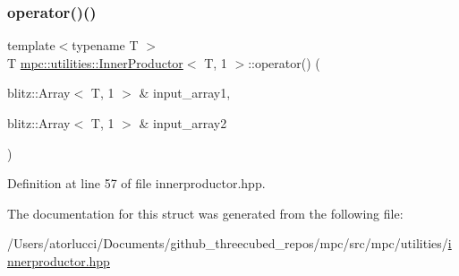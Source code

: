 \subsubsection{\texorpdfstring{operator()()}{operator()()}}
{\footnotesize\ttfamily template$<$typename T $>$ \\
T \mbox{\hyperlink{structmpc_1_1utilities_1_1_inner_productor}{mpc\+::utilities\+::\+Inner\+Productor}}$<$ T, 1 $>$\+::operator() (\begin{DoxyParamCaption}\item[{blitz\+::\+Array$<$ T, 1 $>$ \&}]{input\+\_\+array1,  }\item[{blitz\+::\+Array$<$ T, 1 $>$ \&}]{input\+\_\+array2 }\end{DoxyParamCaption})\hspace{0.3cm}{\ttfamily [inline]}}



Definition at line 57 of file innerproductor.\+hpp.



The documentation for this struct was generated from the following file\+:\begin{DoxyCompactItemize}
\item 
/\+Users/atorlucci/\+Documents/github\+\_\+threecubed\+\_\+repos/mpc/src/mpc/utilities/\mbox{\hyperlink{innerproductor_8hpp}{innerproductor.\+hpp}}\end{DoxyCompactItemize}
